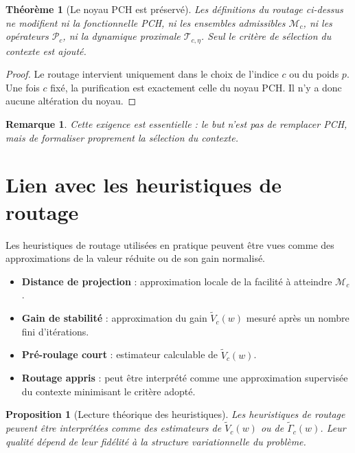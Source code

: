 \documentclass[11pt,a4paper]{article}
\newtheorem{proposition}{Proposition}[section]
\newtheorem{theorem}{Théorème}[section]
\newtheorem{remark}{Remarque}[section]
\newcommand{\Mcal}{\mathcal M}
\newcommand{\Pcal}{\mathcal P}
\newcommand{\Tcal}{\mathcal T}
\begin{document}
\begin{theorem}[Le noyau PCH est préservé]
Les définitions du routage ci-dessus ne modifient ni la fonctionnelle PCH, ni les ensembles admissibles \(\Mcal_c\), ni les opérateurs \(\Pcal_c\), ni la dynamique proximale \(\Tcal_{c,\eta}\). Seul le critère de sélection du contexte est ajouté.
\end{theorem}

\begin{proof}
Le routage intervient uniquement dans le choix de l'indice \(c\) ou du poids \(p\). Une fois \(c\) fixé, la purification est exactement celle du noyau PCH. Il n'y a donc aucune altération du noyau.
\end{proof}

\begin{remark}
Cette exigence est essentielle : le but n'est pas de remplacer PCH, mais de formaliser proprement la sélection du contexte.
\end{remark}

\section{Lien avec les heuristiques de routage}

Les heuristiques de routage utilisées en pratique peuvent être vues comme des approximations de la valeur réduite ou de son gain normalisé.

\begin{itemize}[leftmargin=2em]
\item \textbf{Distance de projection} : approximation locale de la facilité à atteindre \(\Mcal_c\).
\item \textbf{Gain de stabilité} : approximation du gain \(\widetilde V_c(w)\) mesuré après un nombre fini d'itérations.
\item \textbf{Pré-roulage court} : estimateur calculable de \(\widetilde V_c(w)\).
\item \textbf{Routage appris} : peut être interprété comme une approximation supervisée du contexte minimisant le critère adopté.
\end{itemize}

\begin{proposition}[Lecture théorique des heuristiques]
Les heuristiques de routage peuvent être interprétées comme des estimateurs de \(\widetilde V_c(w)\) ou de \(\widetilde \Gamma_c(w)\). Leur qualité dépend de leur fidélité à la structure variationnelle du problème.
\end{proposition}
\end{document}
